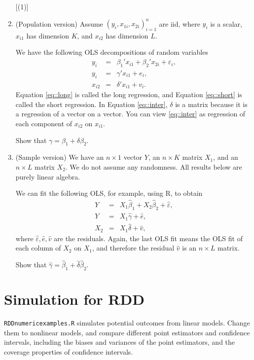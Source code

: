 \documentclass[11pt]{article}
\theoremstyle{definition}
\begin{document}
\begin{enumerate}
[(1)]
\item
(Population version) Assume $(y_i, x_{1i}, x_{2i})_{i=1}^n$ are iid, where $y_i$ is a scalar, $x_{i1}$ has dimension $K$, and $x_{i2}$ has dimension $L$. 

We have the following OLS decompositions of random variables
\begin{eqnarray}
y_i &=& \beta_1 ' x_{i1} + \beta_2' x_{2i} + \varepsilon_i , \label{eq::long}\\
y_i&=&\gamma' x_{i1} + e_i, \label{eq::short}\\
x_{i2} &=& \delta' x_{i1} + v_i . \label{eq::inter}
\end{eqnarray}
Equation \eqref{eq::long} is called the long regression, and Equation \eqref{eq::short} is called the short regression. In Equation \eqref{eq::inter}, $\delta$ is a matrix because it is a regression of a vector on a vector. You can view \eqref{eq::inter} as regression of each component of $x_{i2}$ on $x_{i1}$. 

Show that $\gamma = \beta_1 + \delta \beta_2.$


\item
(Sample version) We have an $n\times 1$ vector $Y$, an $n\times K$ matrix $X_1$, and an $n\times L$ matrix $X_2$. We do not assume any randomness. All results below are purely linear algebra. 

We can fit the following OLS, for example, using R, to obtain
\begin{eqnarray*}
Y &=& X_1 \hat{\beta}_1 + X_2 \hat{\beta}_2+ \hat{\varepsilon},\\
Y &=& X_1 \hat{\gamma} + \hat{e} ,\\
X_2 &=& X_1 \hat{\delta} + \hat{v},
\end{eqnarray*}
where $\hat{\varepsilon},  \hat{e}, \hat{v}$ are the residuals. 
Again, the last OLS fit means the OLS fit of each column of $X_2$ on $X_1$, and therefore the residual $\hat{v}$ is an $n\times L$ matrix.

Show that $\hat{\gamma} = \hat{\beta}_1 +  \hat{\delta} \hat{\beta}_2$.

\end{enumerate}


\section{Simulation for RDD}

\texttt{RDDnumericexamples.R} simulates potential outcomes from linear models. Change them to nonlinear models, and compare different point estimators and confidence intervals, including the biases and variances of the point estimators, and the coverage properties of confidence intervals.
 
\end{document}
